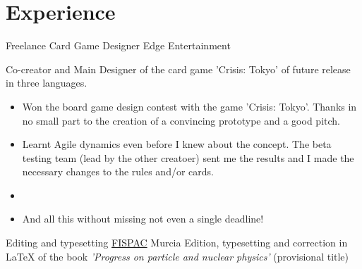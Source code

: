 \documentclass[11pt,a4paper,roman]{moderncv}
\begin{document}





\section{Experience}

	{Freelance Card Game Designer}
	{Edge Entertainment}
	{}
	{}
	{Co-creator and Main Designer of the card game 'Crisis: Tokyo' of future release in three languages.
\begin{itemize}
	\item Won the board game design contest with the game 'Crisis: Tokyo'. Thanks in no small part to the creation of a convincing prototype and a good pitch.
	\item Learnt Agile dynamics even before I knew about the concept. The beta testing team (lead by the other creatoer) sent me the results and I made the necessary changes to the rules and/or cards.
	\item 
	\item And all this without missing not even a single deadline!
\end{itemize}}

	{Editing and typesetting}
	{\href{http://www.um.es/fispac/}{FISPAC}}
	{Murcia}
	{}
	{Edition, typesetting and correction in \LaTeX{} of the book \textit{'Progress on particle and nuclear physics'} (provisional title)\newline{}}
\end{document}
